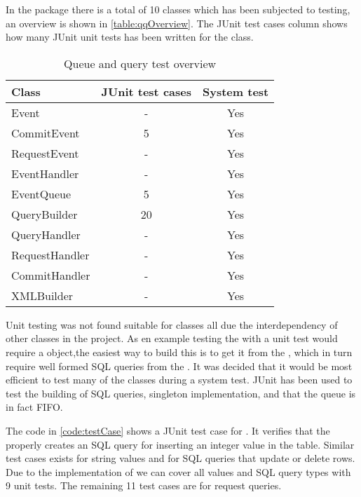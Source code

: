 In the  package there is a total of 10 classes which has been subjected to testing, an overview is shown in \autoref{table:qqOverview}.
The JUnit test cases column shows how many JUnit unit tests has been written for the class.

\begin{table}[H]
  \begin{center}
  \begin{tabular}{l|c|c}
    Class          & JUnit test cases & System test\\
\hline
    Event          & -                &Yes\\
    CommitEvent    & 5                &Yes\\
    RequestEvent   & -                &Yes\\
    EventHandler   & -                &Yes\\
    EventQueue     & 5                &Yes\\
    QueryBuilder   & 20               &Yes\\
    QueryHandler   & -                &Yes\\
    RequestHandler & -                &Yes\\
    CommitHandler  & -                &Yes\\
    XMLBuilder     & -                &Yes\\
  \end{tabular}
  \caption{Queue and query test overview}
  \label{table:qqOverview}
  \end{center}
\end{table}

Unit testing was not found suitable for classes all due the interdependency of other classes in the project. As en example testing the  with a unit test would require
a  object,the easiest way to build this is to get it from the , which in turn require well formed SQL queries from the .
It was decided that it would be most efficient to test many of the classes during a system test. JUnit has been used to test the building of SQL queries, singleton implementation,
and that the queue is in fact FIFO. 

The code in \autoref{code:testCase} shows a JUnit test case for . It verifies that the  properly creates an SQL query for inserting an integer value
in the  table. Similar test cases exists for string values and for SQL queries that update or delete rows.
Due to the implementation of  we can cover all values and SQL query types with 9 unit tests. The remaining 11 test cases are for request queries.

